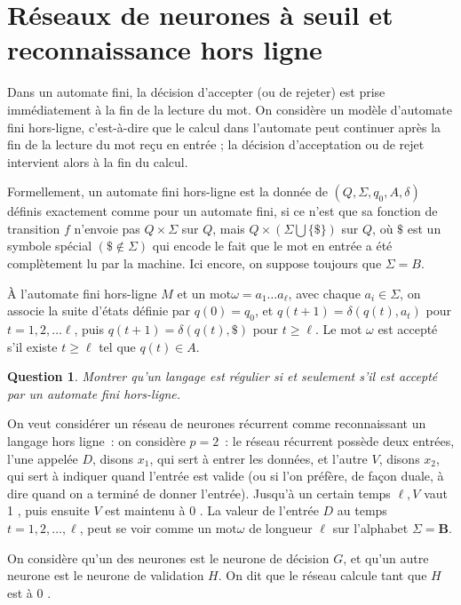 \documentclass[10pt]{article}
\newtheorem{question}{Question}
\begin{document}
\section{Réseaux de neurones à seuil et reconnaissance hors ligne}
Dans un automate fini, la décision d'accepter (ou de rejeter) est prise immédiatement à la fin de la lecture du mot. On considère un modèle d'automate fini hors-ligne, c'est-à-dire que le calcul dans l'automate peut continuer après la fin de la lecture du mot reçu en entrée ; la décision d'acceptation ou de rejet intervient alors à la fin du calcul.

Formellement, un automate fini hors-ligne est la donnée de $\left(Q, Σ, q_{0}, A, δ\right)$ définis exactement comme pour un automate fini, si ce n'est que sa fonction de transition $f$ n'envoie pas $Q \times Σ$ sur $Q$, mais $Q \times(Σ \bigcup\{\$\})$ sur $Q$, où $\$$ est un symbole spécial $(\$ \notin Σ)$ qui encode le fait que le mot en entrée a été complètement lu par la machine. Ici encore, on suppose toujours que $Σ=B$.

À l'automate fini hors-ligne $M$ et un $\mathrm{mot} \omega=a_{1} \ldots a_{\ell}$, avec chaque $a_{i} \in Σ$, on associe la suite d'états définie par $q(0)=q_{0}$, et $q(t+1)=δ\left(q(t), a_{t}\right)$ pour $t=1,2, \ldots \ell$, puis $q(t+1)=δ(q(t), \$)$ pour $t ≥ \ell$. Le mot $\omega$ est accepté s'il existe $t ≥ \ell$ tel que $q(t) \in A$.

\begin{question}
	Montrer qu'un langage est régulier si et seulement s'il est accepté par un automate fini hors-ligne.
\end{question}

On veut considérer un réseau de neurones récurrent comme reconnaissant un langage hors ligne : on considère $p=2$ : le réseau récurrent possède deux entrées, l'une appelée $D$, disons $x_{1}$, qui sert à entrer les données, et l'autre $V$, disons $x_{2}$, qui sert à indiquer quand l'entrée est valide (ou si l'on préfère, de façon duale, à dire quand on a terminé de donner l'entrée). Jusqu'à un certain temps $\ell, V$ vaut 1 , puis ensuite $V$ est maintenu à 0 . La valeur de l'entrée $D$ au temps $t=1,2, \ldots, \ell$, peut se voir comme un $\mathrm{mot} \omega$ de longueur $\ell$ sur l'alphabet $Σ=\mathbf{B}$.

On considère qu'un des neurones est le neurone de décision $G$, et qu'un autre neurone est le neurone de validation $H$. On dit que le réseau calcule tant que $H$ est à 0 .
\end{document}

